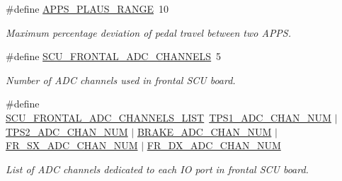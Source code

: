 \begin{DoxyCompactItemize}
\mbox{\label{group___board__model__group_ga3e1022cd2e2154437b583f7ff83f2960}} 
\#define \mbox{\hyperlink{group___board__model__group_ga3e1022cd2e2154437b583f7ff83f2960}{A\+P\+P\+S\+\_\+\+P\+L\+A\+U\+S\+\_\+\+R\+A\+N\+GE}}~10
\begin{DoxyCompactList}\small\item\em Maximum percentage deviation of pedal travel between two A\+P\+PS. \end{DoxyCompactList}\item 
\mbox{\label{group___board__model__group_ga99f732ac210a4d6b6635ed58681d3d71}} 
\#define \mbox{\hyperlink{group___board__model__group_ga99f732ac210a4d6b6635ed58681d3d71}{S\+C\+U\+\_\+\+F\+R\+O\+N\+T\+A\+L\+\_\+\+A\+D\+C\+\_\+\+C\+H\+A\+N\+N\+E\+LS}}~5
\begin{DoxyCompactList}\small\item\em Number of A\+DC channels used in frontal S\+CU board. \end{DoxyCompactList}\item 
\mbox{\label{group___board__model__group_ga1b36d02d5fef3342ea7159722fa50ff3}} 
\#define \mbox{\hyperlink{group___board__model__group_ga1b36d02d5fef3342ea7159722fa50ff3}{S\+C\+U\+\_\+\+F\+R\+O\+N\+T\+A\+L\+\_\+\+A\+D\+C\+\_\+\+C\+H\+A\+N\+N\+E\+L\+S\+\_\+\+L\+I\+ST}}~\mbox{\hyperlink{group___board__pinout__group_ga99b2a7dadaf495e3c559a46440f9141f}{T\+P\+S1\+\_\+\+A\+D\+C\+\_\+\+C\+H\+A\+N\+\_\+\+N\+UM}} $\vert$ \mbox{\hyperlink{group___board__pinout__group_ga4cecb8c10512873904099a1a88d69ed3}{T\+P\+S2\+\_\+\+A\+D\+C\+\_\+\+C\+H\+A\+N\+\_\+\+N\+UM}} $\vert$ \mbox{\hyperlink{group___board__pinout__group_ga310547321c4a016c4ad19922920fadfd}{B\+R\+A\+K\+E\+\_\+\+A\+D\+C\+\_\+\+C\+H\+A\+N\+\_\+\+N\+UM}} $\vert$ \mbox{\hyperlink{group___board__pinout__group_gab536d8e8e876dfd8764cc1d31620803a}{F\+R\+\_\+\+S\+X\+\_\+\+A\+D\+C\+\_\+\+C\+H\+A\+N\+\_\+\+N\+UM}} $\vert$ \mbox{\hyperlink{group___board__pinout__group_ga9d0085cf869db954c00e9c13d9661d51}{F\+R\+\_\+\+D\+X\+\_\+\+A\+D\+C\+\_\+\+C\+H\+A\+N\+\_\+\+N\+UM}}
\begin{DoxyCompactList}\small\item\em List of A\+DC channels dedicated to each IO port in frontal S\+CU board. \end{DoxyCompactList}\item 
\mbox{\label{group___board__model__group_gadedc78ae5ed236e74a4e12c031209d29}} 

\end{DoxyCompactItemize}

